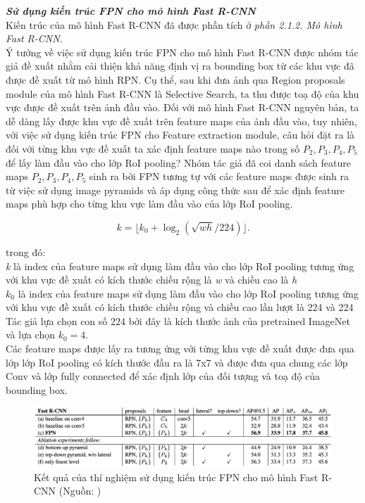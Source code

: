 {    \noindent
    \textbf{\textit{Sử dụng kiến trúc FPN cho mô hình Fast R-CNN}} \\
    Kiến trúc của mô hình Fast R-CNN đã được phần tích ở \textit{phần 2.1.2. Mô hình Fast R-CNN}. \\
    Ý tưởng về việc sử dụng kiến trúc FPN cho mô hình Fast R-CNN được nhóm tác giả đề xuất nhằm cải thiện khả năng định vị ra bounding box từ các khu vực đã được đề xuất từ mô hình RPN.
    Cụ thể, sau khi đưa ảnh qua Region proposals module của mô hình Fast R-CNN là Selective Search, ta thu được toạ độ của khu vực được đề xuất trên ảnh đầu vào.
    Đối với mô hình Fast R-CNN nguyên bản, ta dễ dàng lấy được khu vực đề xuất trên feature maps của ảnh đầu vào, tuy nhiên, với việc sử dụng kiến trúc FPN cho Feature extraction module, câu hỏi đặt ra là đối với từng khu vực đề xuất ta xác định feature maps nào trong số \textit{{${P}_{2}, {P}_{3}, {P}_{4}, {P}_{5}$}} để lấy làm đầu vào cho lớp RoI pooling?
    Nhóm tác giả đã coi danh sách feature maps \textit{{${P}_{2}, {P}_{3}, {P}_{4}, {P}_{5}$}} sinh ra bởi FPN tương tự với các feature maps được sinh ra từ việc sử dụng image pyramids và áp dụng công thức sau để xác định feature maps phù hợp cho từng khu vực làm đầu vào của lớp RoI pooling.

    \begin{equation}
        \label{eq:roi_mapping}
        k = \lfloor k_0 + \log_2(\sqrt{wh} / 224) \rfloor.
    \end{equation}

    \noindent
    trong đó: \\
    \textit{k} là index của feature maps sử dụng làm đầu vào cho lớp RoI pooling tương ứng với khu vực đề xuất có kích thước chiều rộng là \textit{w} và chiều cao là \textit{h} \\
    $k_0$ là index của feature maps sử dụng làm đầu vào cho lớp RoI pooling tương ứng với khu vực đề xuất có kích thước chiều rộng và chiều cao lần lượt là 224 và 224 \\
    Tác giả lựa chọn con số 224 bởi đây là kích thước ảnh của pretrained ImageNet và lựa chọn $k_0 = 4$. \\
    Các feature maps được lấy ra tương ứng với từng khu vực đề xuất được đưa qua lớp lớp RoI pooling có kích thước đầu ra là 7x7 và được đưa qua chung các lớp Conv và lớp fully connected để xác định lớp của đối tượng và toạ độ của bounding box.

    \begin{figure}[H]
        \centering
        \includegraphics[width=12cm] {images/fpn_results_2}
        \caption{Kết quả của thí nghiệm sử dụng kiến trúc FPN cho mô hình Fast R-CNN (Nguồn: \cite{lin2017feature})}
        \label{fig:fpn_results}
    \end{figure}
    
}
